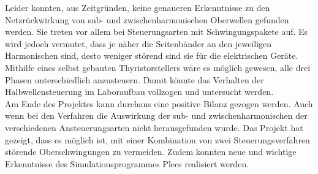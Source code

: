 Leider konnten, aus Zeitgründen, keine genaueren Erkenntnisse zu den Netzrückwirkung von sub- und zwischenharmonischen Oberwellen gefunden werden. Sie treten vor allem bei Steuerungsarten mit Schwingungspakete auf. Es wird jedoch vermutet, dass je näher die Seitenbänder an den jeweiligen Harmonischen sind, desto weniger störend sind sie für die elektrischen Geräte.\\
Mithilfe eines selbst gebauten Thyristorstellers wäre es möglich gewesen, alle drei Phasen unterschiedlich anzusteuern. Damit könnte das Verhalten der Halbwellensteuerung im Laboraufbau vollzogen und untersucht werden.\\
Am Ende des Projektes kann durchaus eine positive Bilanz gezogen werden. Auch wenn bei den Verfahren die Auswirkung der sub- und zwischenharmonischen der verschiedenen Ansteuerungsarten nicht herausgefunden wurde. Das Projekt hat gezeigt, dass es möglich ist, mit einer Kombination von zwei Steuerungsverfahren störende Oberschwingungen zu vermeiden. Zudem konnten neue und wichtige Erkenntnisse des Simulationsprogrammes Plecs realisiert werden.  






